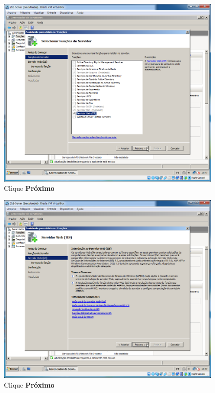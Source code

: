 \documentclass[10pt]{article}
\begin{document}
\begin{figure}[H]
    \centering
    \caption{Clique \textbf{Próximo}}
    \label{fig:IIS008}
    \includegraphics[width=\linewidth]{images/IIS/IIS008.png}
\end{figure}
\begin{figure}[H]
    \centering
    \caption{Clique \textbf{Próximo}}
    \label{fig:IIS009}
    \includegraphics[width=\linewidth]{images/IIS/IIS009.png}
\end{figure}
\end{document}
